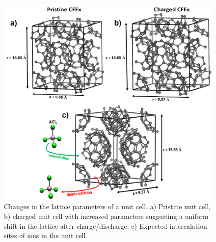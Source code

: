 \begin{figure}[h!]
  \centering
  \includegraphics[width=\textwidth]{Figures/chap5fig/cfexcrys}
    \caption{Changes in the lattice parameters of a  unit cell. a) Pristine unit cell, b) charged unit cell with increased parameters suggesting a uniform shift in the lattice after charge/discharge. c) Expected intercalation sites of  ions in the unit cell.}
  \label{Figures/chap5fig:cfexcrys}
\end{figure}

